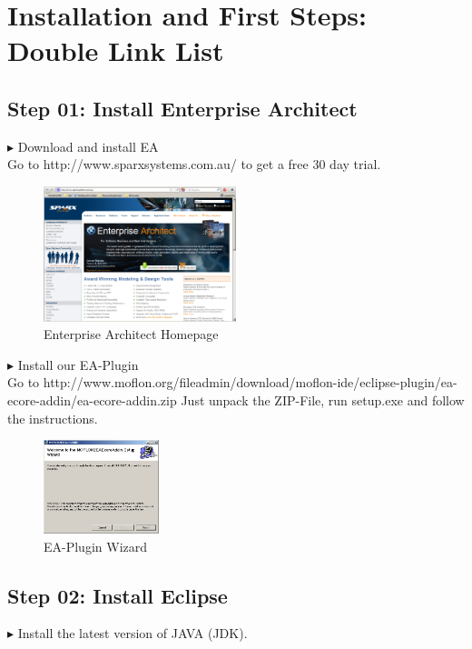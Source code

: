 \section{Installation and First Steps: Double Link List}

\subsection{Step 01: Install Enterprise Architect}
$\blacktriangleright$ Download and install EA\\
Go to http://www.sparxsystems.com.au/ to get a free 30 day trial.
\begin{figure}[h]
	\centering
  \includegraphics[width=0.5\textwidth]{pics/ea_download.png}
	\caption{Enterprise Architect Homepage}
\end{figure}

$\blacktriangleright$ Install our EA-Plugin\\
Go to http://www.moflon.org/fileadmin/download/moflon-ide/eclipse-plugin/ea-ecore-addin/ea-ecore-addin.zip
Just unpack the ZIP-File, run setup.exe and follow the instructions.
\begin{figure}[h]
	\centering
  \includegraphics[width=0.3\textwidth]{pics/eaplugin_install.png}
	\caption{EA-Plugin Wizard}
\end{figure}

\subsection{Step 02: Install Eclipse}
$\blacktriangleright$ Install the latest version of JAVA (JDK).\\ %

